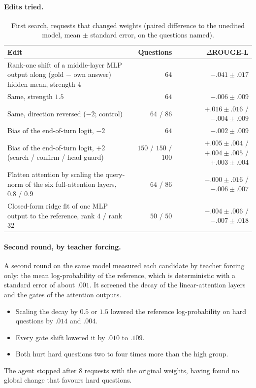 \documentclass[11pt,a4paper]{article}
\newcommand{\rl}{ROUGE-L}
\begin{document}
\paragraph{Edits tried.}
\begin{table}[H]
\centering
\caption{First search, requests that changed weights (paired difference to the unedited model, mean $\pm$ standard error, on the questions named).}\label{tab:wspfail}
\small
\begin{tabular}{@{}p{6.6cm}rr@{}}
\toprule
Edit & Questions & $\Delta$\rl{}\\
\midrule
Rank-one shift of a middle-layer MLP output along (gold $-$ own answer) hidden mean, strength $4$ & $64$ & $-.041\pm.017$\\
Same, strength $1.5$ & $64$ & $-.006\pm.009$\\
Same, direction reversed ($-2$; control) & $64$ / $86$ & $+.016\pm.016$ / $-.004\pm.009$\\
Bias of the end-of-turn logit, $-2$ & $64$ & $-.002\pm.009$\\
Bias of the end-of-turn logit, $+2$ (search / confirm / head guard) & $150$ / $150$ / $100$ & $+.005\pm.004$ / $+.004\pm.005$ / $+.003\pm.004$\\
Flatten attention by scaling the query-norm of the six full-attention layers, $0.8$ / $0.9$ & $64$ / $86$ & $-.000\pm.016$ / $-.006\pm.007$\\
Closed-form ridge fit of one MLP output to the reference, rank $4$ / rank $32$ & $50$ / $50$ & $-.004\pm.006$ / $-.007\pm.018$\\
\bottomrule
\end{tabular}
\end{table}
\paragraph{Second round, by teacher forcing.} A second round on the same model measured each candidate by teacher forcing only: the mean log-probability of the reference, which is deterministic with a standard error of about $.001$. It screened the decay of the linear-attention layers and the gates of the attention outputs.
\begin{itemize}[leftmargin=*]
\item Scaling the decay by $0.5$ or $1.5$ lowered the reference log-probability on hard questions by $.014$ and $.004$.
\item Every gate shift lowered it by $.010$ to $.109$.
\item Both hurt hard questions two to four times more than the high group.
\end{itemize}
The agent stopped after $8$ requests with the original weights, having found no global change that favours hard questions.
\end{document}
